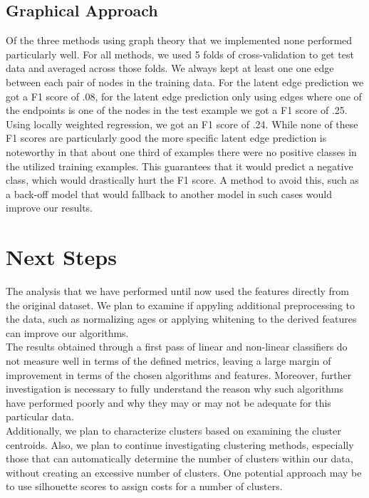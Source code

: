 \documentclass[twoside,twocolumn,paper=letter,fontsize=11pt]{article}
\begin{document}
\subsection{Graphical Approach}

Of the three methods using graph theory that we implemented none performed
particularly well. For all methods, we used 5 folds of cross-validation
to get test data and averaged across those folds. We always kept at least one
one edge between each pair of nodes in the training data. For the latent edge
prediction we got a F1 score of .08, for the latent edge prediction only using
edges where one of the endpoints is one of the nodes in the test example we got
a F1 score of .25. Using locally weighted regression, we got an F1 score of
.24. While none of these F1 scores are particularly good the more specific
latent edge prediction is noteworthy in that about one third of examples there
were no positive classes in the utilized training examples. This guarantees
that it would predict a negative class, which would drastically hurt the F1
score. A method to avoid this, such as a back-off model that would
fallback to another model in such cases would improve our results.
\section{Next Steps}

The analysis that we have performed until now used the features directly from
the original dataset. We plan to examine if appyling additional preprocessing to
the data, such as normalizing ages or applying whitening to the derived features
can improve our algorithms.\\

The results obtained through a first pass of linear and non-linear classifiers
do not measure well in terms of the defined metrics, leaving a large margin of
improvement in terms of the chosen algorithms and features. Moreover, further
investigation is necessary to fully understand  the reason why such algorithms
have performed poorly and why they may or may not be adequate for this
particular data. \\

Additionally, we plan to characterize clusters based on examining the cluster
centroids. Also, we plan to continue investigating clustering methods,
especially those that can automatically determine the number of clusters within
our data, without creating an excessive number of clusters. One potential
approach may be to use silhouette scores to assign costs for a number of
clusters.\\
\end{document}
